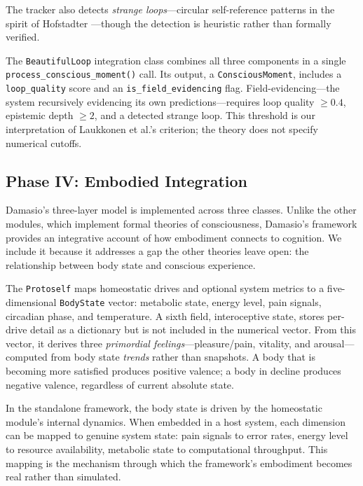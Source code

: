 The tracker also detects \textit{strange loops}---circular self-reference patterns in the spirit of Hofstadter \cite{hofstadter1979}---though the detection is heuristic rather than formally verified.

The \texttt{BeautifulLoop} integration class combines all three components in a single \texttt{process\_conscious\_moment()} call. Its output, a \texttt{ConsciousMoment}, includes a \texttt{loop\_quality} score and an \texttt{is\_field\_evidencing} flag. Field-evidencing---the system recursively evidencing its own predictions---requires loop quality $\geq 0.4$, epistemic depth $\geq 2$, and a detected strange loop. This threshold is our interpretation of Laukkonen et al.'s criterion; the theory does not specify numerical cutoffs.

\subsection{Phase IV: Embodied Integration}

Damasio's \cite{damasio1999,damasio2010} three-layer model is implemented across three classes. Unlike the other modules, which implement formal theories of consciousness, Damasio's framework provides an integrative account of how embodiment connects to cognition. We include it because it addresses a gap the other theories leave open: the relationship between body state and conscious experience.

The \texttt{Protoself} maps homeostatic drives and optional system metrics to a five-dimensional \texttt{BodyState} vector: metabolic state, energy level, pain signals, circadian phase, and temperature. A sixth field, interoceptive state, stores per-drive detail as a dictionary but is not included in the numerical vector. From this vector, it derives three \textit{primordial feelings}---pleasure/pain, vitality, and arousal---computed from body state \textit{trends} rather than snapshots. A body that is becoming more satisfied produces positive valence; a body in decline produces negative valence, regardless of current absolute state.

In the standalone framework, the body state is driven by the homeostatic module's internal dynamics. When embedded in a host system, each dimension can be mapped to genuine system state: pain signals to error rates, energy level to resource availability, metabolic state to computational throughput. This mapping is the mechanism through which the framework's embodiment becomes real rather than simulated.

